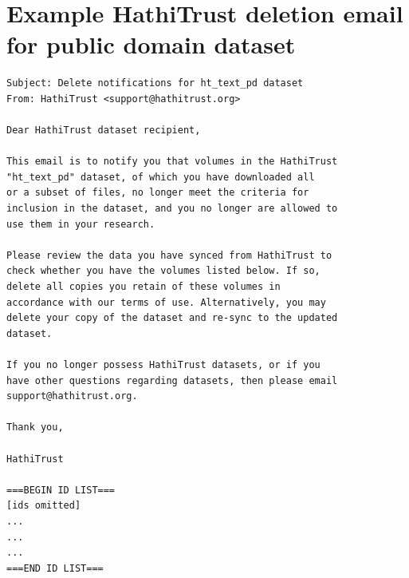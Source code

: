 \documentclass{anthology-ch}         %
\begin{document}
\section{Example HathiTrust deletion email for public domain dataset} \label{appdx:second}

\begin{verbatim}
Subject: Delete notifications for ht_text_pd dataset
From: HathiTrust <support@hathitrust.org>

Dear HathiTrust dataset recipient,

This email is to notify you that volumes in the HathiTrust
"ht_text_pd" dataset, of which you have downloaded all
or a subset of files, no longer meet the criteria for
inclusion in the dataset, and you no longer are allowed to
use them in your research.

Please review the data you have synced from HathiTrust to
check whether you have the volumes listed below. If so,
delete all copies you retain of these volumes in
accordance with our terms of use. Alternatively, you may
delete your copy of the dataset and re-sync to the updated
dataset.

If you no longer possess HathiTrust datasets, or if you
have other questions regarding datasets, then please email
support@hathitrust.org.

Thank you,

HathiTrust

===BEGIN ID LIST===
[ids omitted]
...
...
...
===END ID LIST===
\end{verbatim}

\end{document}
